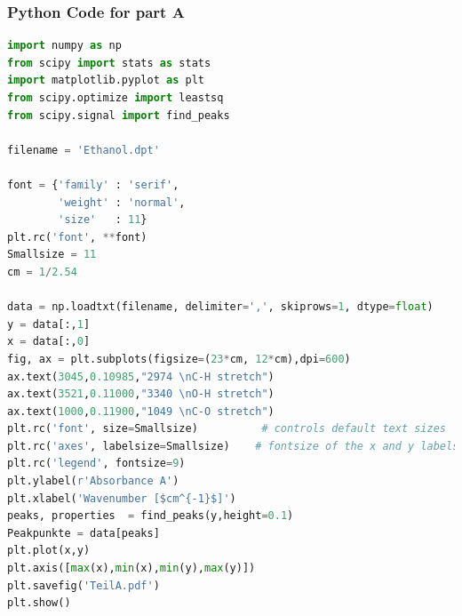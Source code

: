 \documentclass[a4paper,abstracton]{article}	                       %
\begin{document}
\subsubsection*{Python Code for part A}
\begin{lstlisting}[language=Python]
import numpy as np
from scipy import stats as stats
import matplotlib.pyplot as plt
from scipy.optimize import leastsq
from scipy.signal import find_peaks

filename = 'Ethanol.dpt'

font = {'family' : 'serif',
        'weight' : 'normal',
        'size'   : 11}
plt.rc('font', **font)
Smallsize = 11
cm = 1/2.54
 
data = np.loadtxt(filename, delimiter=',', skiprows=1, dtype=float)
y = data[:,1]
x = data[:,0]
fig, ax = plt.subplots(figsize=(23*cm, 12*cm),dpi=600)  
ax.text(3045,0.10985,"2974 \nC-H stretch")
ax.text(3521,0.11000,"3340 \nO-H stretch")
ax.text(1000,0.11900,"1049 \nC-O stretch")
plt.rc('font', size=Smallsize)          # controls default text sizes
plt.rc('axes', labelsize=Smallsize)    # fontsize of the x and y labels
plt.rc('legend', fontsize=9)  
plt.ylabel(r'Absorbance A')
plt.xlabel('Wavenumber [$cm^{-1}$]')
peaks, properties  = find_peaks(y,height=0.1)
Peakpunkte = data[peaks]
plt.plot(x,y)
plt.axis([max(x),min(x),min(y),max(y)])
plt.savefig('TeilA.pdf')
plt.show()
\end{lstlisting}
\end{document}
